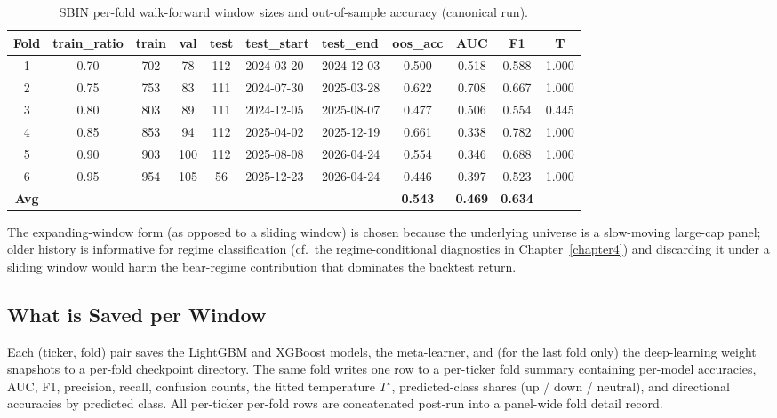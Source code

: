 \begin{table}[H]
\centering
\caption{SBIN per-fold walk-forward window sizes and out-of-sample accuracy (canonical run).}
\label{tab:sbin_wf_example}
\renewcommand{\arraystretch}{1.3}
\begin{adjustbox}{max width=\textwidth}
\begin{tabular}{c c c c c l l c c c c}
\toprule
\textbf{Fold} & \textbf{train\_ratio} & \textbf{train} & \textbf{val} & \textbf{test} & \textbf{test\_start} & \textbf{test\_end} & \textbf{oos\_acc} & \textbf{AUC} & \textbf{F1} & \textbf{T} \\
\midrule
1 & 0.70 & 702 & 78  & 112 & 2024-03-20 & 2024-12-03 & 0.500 & 0.518 & 0.588 & 1.000 \\
2 & 0.75 & 753 & 83  & 111 & 2024-07-30 & 2025-03-28 & 0.622 & 0.708 & 0.667 & 1.000 \\
3 & 0.80 & 803 & 89  & 111 & 2024-12-05 & 2025-08-07 & 0.477 & 0.506 & 0.554 & 0.445 \\
4 & 0.85 & 853 & 94  & 112 & 2025-04-02 & 2025-12-19 & 0.661 & 0.338 & 0.782 & 1.000 \\
5 & 0.90 & 903 & 100 & 112 & 2025-08-08 & 2026-04-24 & 0.554 & 0.346 & 0.688 & 1.000 \\
6 & 0.95 & 954 & 105 & 56  & 2025-12-23 & 2026-04-24 & 0.446 & 0.397 & 0.523 & 1.000 \\
\midrule
\textbf{Avg} & & & & & & & \textbf{0.543} & \textbf{0.469} & \textbf{0.634} & \\
\bottomrule
\end{tabular}
\end{adjustbox}
\end{table}

The expanding-window form (as opposed to a sliding window) is chosen because the underlying universe is a slow-moving large-cap panel; older history is informative for regime classification (cf.\ the regime-conditional diagnostics in Chapter~\ref{chapter4}) and discarding it under a sliding window would harm the bear-regime contribution that dominates the backtest return.

\subsection{What is Saved per Window}

Each (ticker, fold) pair saves the LightGBM and XGBoost models, the meta-learner, and (for the last fold only) the deep-learning weight snapshots to a per-fold checkpoint directory. The same fold writes one row to a per-ticker fold summary containing per-model accuracies, AUC, F1, precision, recall, confusion counts, the fitted temperature $T^\star$, predicted-class shares (up / down / neutral), and directional accuracies by predicted class. All per-ticker per-fold rows are concatenated post-run into a panel-wide fold detail record.


